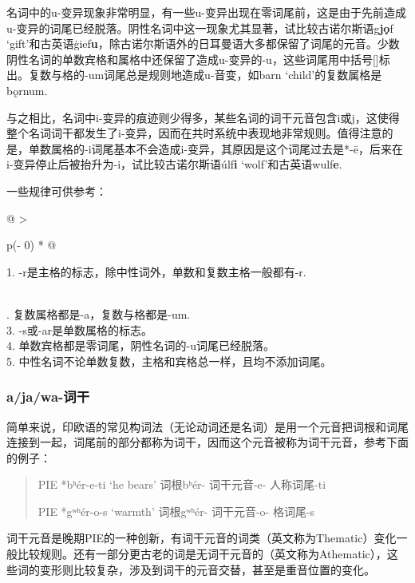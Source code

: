 名词中的u-变异现象非常明显，有一些u-变异出现在零词尾前，这是由于先前造成u-变异的词尾已经脱落。阴性名词中这一现象尤其显著，试比较古诺尔斯语g\textbf{jǫ}f
`gift'和古英语ġief\textbf{u}，除古诺尔斯语外的日耳曼语大多都保留了词尾的元音。少数阴性名词的单数宾格和属格中还保留了造成u-变异的-u，这些词尾用中括号{[}{]}标出。复数与格的-um词尾总是规则地造成u-音变，如barn
`child'的复数属格是bǫrnum.

与之相比，名词中i-变异的痕迹则少得多，某些名词的词干元音包含i或j，这使得整个名词词干都发生了i-变异，因而在共时系统中表现地非常规则。值得注意的是，单数属格的-i词尾基本不会造成i-变异，其原因是这个词尾过去是*-ē，后来在i-变异停止后被抬升为-i，试比较古诺尔斯语úlf\textbf{i}
`wolf'和古英语wulf\textbf{e}.

一些规律可供参考：

\begin{longtable}[]{@{}
  >{\raggedright\arraybackslash}p{(\columnwidth - 0\tabcolsep) * }@{}}
\toprule\noalign{}
\begin{minipage}[b]{\linewidth}\raggedright
1. -r是主格的标志，除中性词外，单数和复数主格一般都有-r.
\end{minipage} \\
\midrule\noalign{}
\endhead
\bottomrule\noalign{}
. 复数属格都是-a，复数与格都是-um. \\
3. -s或-ar是单数属格的标志。 \\
4. 单数宾格都是零词尾，阴性名词的-u词尾已经脱落。 \\
5. 中性名词不论单数复数，主格和宾格总一样，且均不添加词尾。 \\
\end{longtable}

\subsubsection{a/ja/wa-词干}\label{a/ja/wa-词干}

简单来说，印欧语的常见构词法（无论动词还是名词）是用一个元音把词根和词尾连接到一起，词尾前的部分都称为词干，因而这个元音被称为词干元音，参考下面的例子：

\begin{quote}
PIE *bʰér-e-ti `he bears' 词根bʰér- 词干元音-e- 人称词尾-ti

PIE *gʷʰér-o-s `warmth' 词根gʷʰér- 词干元音-o- 格词尾-s
\end{quote}

词干元音是晚期PIE的一种创新，有词干元音的词类（英文称为Thematic）变化一般比较规则。还有一部分更古老的词是无词干元音的（英文称为Athematic），这些词的变形则比较复杂，涉及到词干的元音交替，甚至是重音位置的变化。

